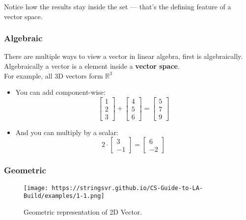 \documentclass[12pt]{article}
\begin{document}
            Notice how the results stay inside the set — that’s the defining feature of a vector space.
            
        \subsubsection{Algebraic}
            There are multiple ways to view a vector in linear algebra, first is algebraically. Algebraically a vector is a element inside a \textbf{vector space}. \\
            For example, all 3D vectors form $\mathbb{R}^3$

            \begin{itemize}
                \item  You can add component-wise: \\
                \begin{equation}
                  \begin{bmatrix}1 \\ 2 \\ 3 \end{bmatrix} + \begin{bmatrix}4 \\ 5 \\ 6 \end{bmatrix} = \begin{bmatrix}5 \\ 7 \\ 9 \end{bmatrix}
                \end{equation}

                \item  And you can multiply by a scalar: \\
                \begin{equation}
                   2 \cdot \begin{bmatrix}3 \\ -1 \end{bmatrix} = \begin{bmatrix}6 \\ -2 \end{bmatrix}
                \end{equation}
            \end{itemize}
            
        \subsubsection{Geometric}
            \begin{figure}[h]
                \centering
                \texttt{[image: https://stringsvr.github.io/CS-Guide-to-LA-Build/examples/1-1.png]} 
                \caption{Geometric representation of 2D Vector.}
                \label{fig:1}
            \end{figure}
        
\end{document}

